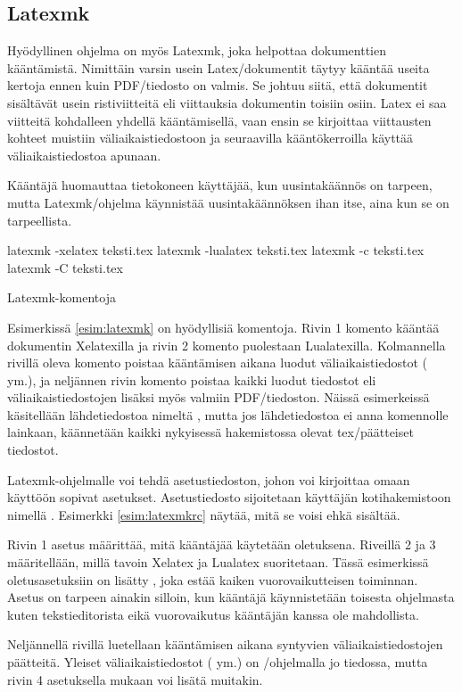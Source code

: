 \subsection{Latexmk}

Hyödyllinen ohjelma on myös Latexmk, joka helpottaa dokumenttien
kääntämistä. Nimittäin varsin usein Latex\-/dokumentit täytyy kääntää
useita kertoja ennen kuin PDF\-/tiedosto on valmis. Se johtuu siitä,
että dokumentit sisältävät usein ristiviitteitä eli viittauksia
dokumentin toisiin osiin. Latex ei saa viitteitä kohdalleen yhdellä
kääntämisellä, vaan ensin se kirjoittaa viittausten kohteet muistiin
väli\-aikais\-tiedostoon ja seuraavilla kääntökerroilla käyttää
väli\-aikais\-tiedostoa apunaan.

Kääntäjä huomauttaa tietokoneen käyttäjää, kun uusintakäännös on
tarpeen, mutta Latexmk\-/ohjelma käynnistää uusintakäännöksen ihan itse,
aina kun se on tarpeellista.

\begin{esimerkki}
\begin{koodilohko}
  latexmk -xelatex  teksti.tex
  latexmk -lualatex teksti.tex
  latexmk -c teksti.tex
  latexmk -C teksti.tex
\end{koodilohko}
\caption{Latexmk-komentoja}
\label{esim:latexmk}
\end{esimerkki}

Esimerkissä \ref{esim:latexmk} on hyödyllisiä komentoja. Rivin 1 komento
kääntää dokumentin Xelatexilla ja rivin 2 komento puolestaan
Lua\-latexilla. Kolmannella rivillä oleva komento poistaa kääntämisen
aikana luodut väli\-aikaistiedostot ( ym.), ja
neljännen rivin komento poistaa kaikki luodut tiedostot eli
väli\-aikais\-tiedostojen lisäksi myös valmiin PDF\-/tiedoston. Näissä
esimerkeissä käsitellään lähdetiedostoa nimeltä ,
mutta jos lähdetiedostoa ei anna komennolle lainkaan, käännetään kaikki
nykyisessä hakemistossa olevat tex\-/päätteiset tiedostot.



Latexmk-ohjelmalle voi tehdä asetustiedoston, johon voi kirjoittaa omaan
käyttöön sopivat asetukset. Asetustiedosto sijoitetaan käyttäjän
kotihakemistoon nimellä . Esimerkki
\ref{esim:latexmkrc} näytää, mitä se voisi ehkä sisältää.

Rivin 1 asetus määrittää, mitä kääntäjää käytetään oletuksena. Riveillä
2 ja 3 määritellään, millä tavoin Xelatex ja Lualatex suoritetaan. Tässä
esimerkissä oletus\-asetuksiin on lisätty , joka
estää kaiken vuorovaikutteisen toiminnan. Asetus on tarpeen ainakin
silloin, kun kääntäjä käynnistetään toisesta ohjelmasta kuten
teks\-ti\-edi\-to\-ris\-ta eikä vuorovaikutus kääntäjän kanssa ole
mahdollista.

Neljännellä rivillä luetellaan kääntämisen aikana syntyvien
väli\-aikais\-tiedostojen päätteitä. Yleiset väli\-aikais\-tiedostot
( ym.) on \-/ohjelmalla jo tiedossa,
mutta rivin 4 asetuksella mukaan voi lisätä muitakin.
